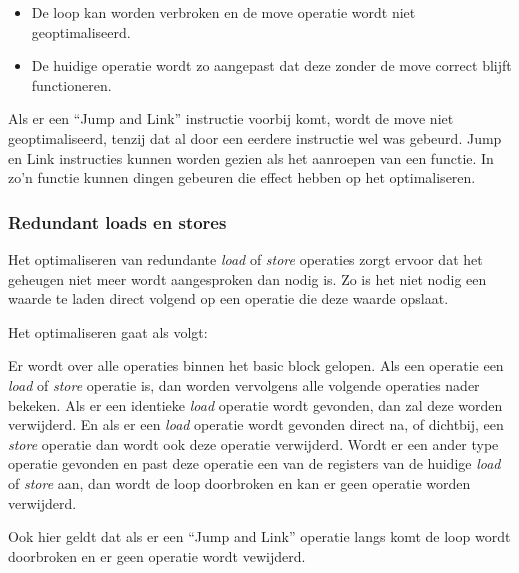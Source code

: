 \documentclass[11pt, a4paper]{uva_report}
\begin{document}
                \begin{itemize}
                    \item De loop kan worden verbroken en de move operatie wordt
                    niet geoptimaliseerd.
                    \item De huidige operatie wordt zo aangepast dat deze zonder
                    de move correct blijft functioneren.
                \end{itemize}

                Als er een ``Jump and Link'' instructie voorbij komt, wordt de
                move niet geoptimaliseerd, tenzij dat al door een eerdere
                instructie wel was gebeurd. Jump en Link instructies kunnen
                worden gezien als het aanroepen van een functie. In zo'n functie
                kunnen dingen gebeuren die effect hebben op het optimaliseren.
            
            \subsubsection{Redundant loads en stores}
                Het optimaliseren van redundante \emph{load} of \emph{store}
                operaties zorgt ervoor dat het geheugen niet meer wordt
                aangesproken dan nodig is. Zo is het niet nodig een waarde te
                laden direct volgend op een operatie die deze waarde opslaat.

                Het optimaliseren gaat als volgt:

                Er wordt over alle operaties binnen het basic block gelopen. Als
                een operatie een \emph{load} of \emph{store} operatie is, dan
                worden vervolgens alle volgende operaties nader bekeken. Als er
                een identieke \emph{load} operatie wordt gevonden, dan zal deze
                worden verwijderd. En als er een \emph{load} operatie wordt
                gevonden direct na, of dichtbij, een \emph{store} operatie dan
                wordt ook deze operatie verwijderd. Wordt er een ander type
                operatie gevonden en past deze operatie een van de registers van
                de huidige \emph{load} of \emph{store} aan, dan wordt de loop
                doorbroken en kan er geen operatie worden verwijderd.

                Ook hier geldt dat als er een ``Jump and Link'' operatie langs
                komt de loop wordt doorbroken en er geen operatie wordt
                vewijderd.
\end{document}
